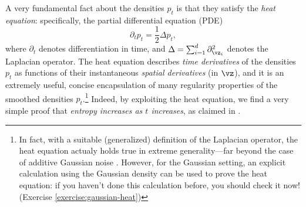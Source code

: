 \documentclass[../../book-main.tex]{subfiles}
\begin{document}
A very fundamental fact about the densities $p_t$ is
that they satisfy the \textit{heat equation}: specifically, the partial
differential equation (PDE)
\begin{equation*}
    \partial_t p_t = \frac{1}{2} \Delta p_t,
\end{equation*}
where $\partial_t$ denotes differentiation in time, and $\Delta = \sum_{i=1}^d \partial^2_{\vz_i}$ denotes the Laplacian operator.
The heat equation describes \textit{time derivatives} of the densities $p_t$ as
functions of their instantaneous \textit{spatial derivatives} (in $\vz$), and it
is an extremely useful, concise encapsulation of many regularity properties of
the smoothed densities $p_t$.\footnote{In fact, with a suitable (generalized) definition of the Laplacian operator, the heat
equation actualy holds true in extreme generality---far beyond the case of additive Gaussian
noise \cite{Bakry2016-pl}. However, for the Gaussian setting, an explicit
calculation using the Gaussian density can be used to prove the heat
equation: if you haven't done this calculation before, you should check it
now! (Exercise \ref{exercise:gaussian-heat})}
Indeed, by exploiting the heat equation, we find a very simple proof that
\textit{entropy increases as $t$ increases}, as claimed in
.
\end{document}
